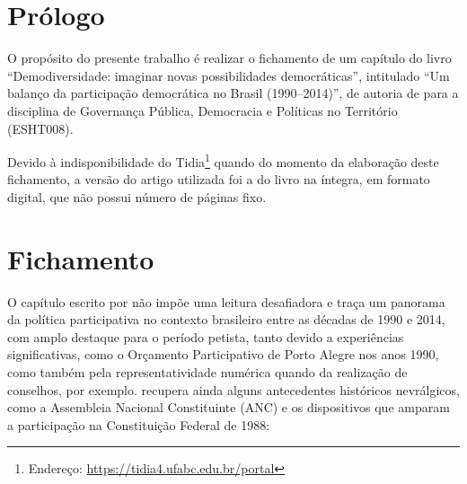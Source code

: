 \documentclass[
article,			%
11pt,				%
oneside,			%
a4paper,			%
english,			%
brazil,				%
sumario=tradicional
]{abntex2}
\begin{document}
	
	
	\frenchspacing 
	
	
	\maketitle
	

	\textual
	
	
	\section*{Prólogo}
	
	O propósito do presente trabalho é realizar o fichamento de um capítulo do livro ``Demodiversidade: imaginar novas possibilidades democráticas'', intitulado ``Um balanço da participação democrática no Brasil (1990–2014)'', de autoria de  para a disciplina de Governança Pública, Democracia e Políticas no Território (ESHT008).
	
	Devido à indisponibilidade do Tidia\footnote{Endereço: \url{https://tidia4.ufabc.edu.br/portal}} quando do momento da elaboração deste fichamento, a versão do artigo utilizada foi a do livro na íntegra, em formato digital, que não possui número de páginas fixo.
	
	\section{Fichamento}
	
	O capítulo escrito por  não impõe uma leitura desafiadora e traça um panorama da política participativa no contexto brasileiro entre as décadas de 1990 e 2014, com amplo destaque para o período petista, tanto devido a experiências significativas, como o Orçamento Participativo de Porto Alegre nos anos 1990, como também pela representatividade numérica quando da realização de conselhos, por exemplo.  recupera ainda alguns antecedentes históricos nevrálgicos, como a Assembleia Nacional Constituinte (ANC) e os dispositivos que amparam a participação na Constituição Federal de 1988:
	
\end{document}
